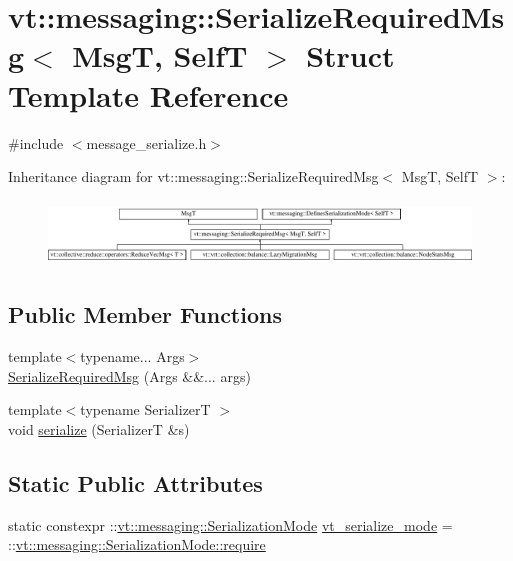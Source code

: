 \hypertarget{structvt_1_1messaging_1_1_serialize_required_msg}{}\section{vt\+:\+:messaging\+:\+:Serialize\+Required\+Msg$<$ MsgT, SelfT $>$ Struct Template Reference}
\label{structvt_1_1messaging_1_1_serialize_required_msg}


{\ttfamily \#include $<$message\+\_\+serialize.\+h$>$}

Inheritance diagram for vt\+:\+:messaging\+:\+:Serialize\+Required\+Msg$<$ MsgT, SelfT $>$\+:\begin{figure}[H]
\begin{center}
\leavevmode
\includegraphics[height=1.733746cm]{structvt_1_1messaging_1_1_serialize_required_msg}
\end{center}
\end{figure}
\subsection*{Public Member Functions}
\begin{DoxyCompactItemize}
\item 
{\footnotesize template$<$typename... Args$>$ }\\\hyperlink{structvt_1_1messaging_1_1_serialize_required_msg_af50357bbc47bf49c049442b6942a75ad}{Serialize\+Required\+Msg} (Args \&\&... args)
\item 
{\footnotesize template$<$typename SerializerT $>$ }\\void \hyperlink{structvt_1_1messaging_1_1_serialize_required_msg_a2e27ae5612c1b78ea9fd982c88f415b0}{serialize} (SerializerT \&s)
\end{DoxyCompactItemize}
\subsection*{Static Public Attributes}
\begin{DoxyCompactItemize}
\item 
static constexpr \+::\hyperlink{namespacevt_1_1messaging_a436c5b9fc7f591e5978a136999cb9ef8}{vt\+::messaging\+::\+Serialization\+Mode} \hyperlink{structvt_1_1messaging_1_1_serialize_required_msg_ac3c448432ebe8ee3c2d454e2034bdd27}{vt\+\_\+serialize\+\_\+mode} = \+::\hyperlink{namespacevt_1_1messaging_a436c5b9fc7f591e5978a136999cb9ef8af0ffd3b7c2574ac324603ed00488c850}{vt\+::messaging\+::\+Serialization\+Mode\+::require}
\end{DoxyCompactItemize}


